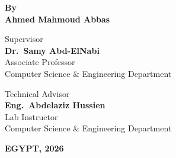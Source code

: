 \begin{titlepage}
\begin{center}
\vspace{0.4cm}

{\normalsize\bfseries By}\\[6pt]
{\large\bfseries Ahmed Mahmoud Abbas}

\vspace{0.4cm}

\begin{minipage}[t]{0.48\textwidth}
  \centering
  {\normalsize Supervisor}\\[4pt]
  {\large\bfseries Dr.\ Samy Abd-ElNabi}\\[3pt]
  {\small\centering
    Associate Professor\\
    Computer Science \& Engineering Department
  }
\end{minipage}
\hfill
\begin{minipage}[t]{0.48\textwidth}
  \centering
  {\normalsize Technical Advisor}\\[4pt]
  {\large\bfseries Eng.\ Abdelaziz Hussien}\\[3pt]
  {\small\centering
    Lab Instructor\\
    Computer Science \& Engineering Department
  }
\end{minipage}

\vfill

{\normalsize\bfseries EGYPT, 2026}

\end{center}
\end{titlepage}
\nopagecolor
\restoregeometry
